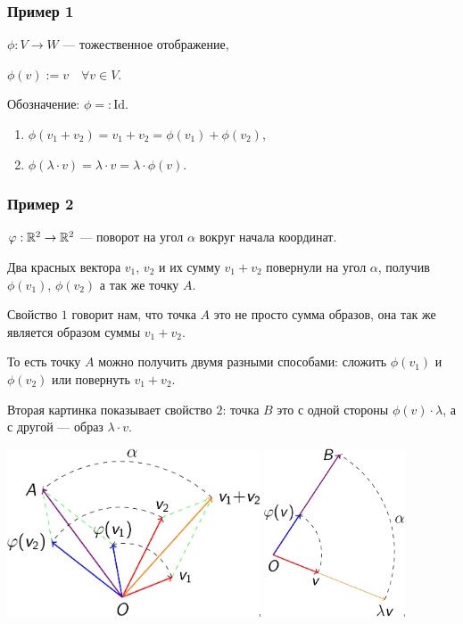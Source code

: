 \subsubsection{Пример 1}

$\phi: V \to W$ --- тожественное отображение,

$\phi(v) := v \quad \forall v \in V$.

Обозначение: $\phi =: \text{Id}$.

\bigskip
\begin{enumerate}[label=\arabic*), nosep]
\item $\phi(v_1 + v_2) = v_1 + v_2 = \phi(v_1) + \phi(v_2)$,
\item $\phi(\lambda \cdot v) = \lambda \cdot v = \lambda \cdot \phi(v)$.
\end{enumerate}

\subsubsection{Пример 2}

$\varphi: \mathbb{R}^2 \to \mathbb{R}^2$ --- поворот на угол $\alpha$ вокруг начала координат. 

\bigskip
Два красных вектора $v_1$, $v_2$ и их сумму $v_1 + v_2$ повернули на угол $\alpha$, получив $\phi(v_1)$, $\phi(v_2)$ а так же точку $A$.

Свойство $1$ говорит нам, что точка $A$ это не просто сумма образов, она так же является образом суммы $v_1 + v_2$.

То есть точку $A$ можно получить двумя разными способами: сложить $\phi(v_1)$ и $\phi(v_2)$ или повернуть $v_1 + v_2$.

\bigskip
Вторая картинка показывает свойство $2$: точка $B$ это с одной стороны $\phi(v) \cdot \lambda$, а с другой --- образ $\lambda \cdot v$. 

\begin{center}
    \includegraphics[height=5cm]{lecture16_example2_1}
    \hspace{2cm}
    \includegraphics[height=5cm]{lecture16_example2_2}
\end{center}


